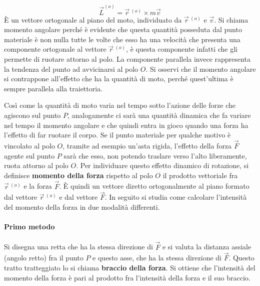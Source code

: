 \[
	\boxed{\vec{L}^{(o)}=\vec{r}\,^{(o)}\times m\vec{v}}
\]
È un vettore ortogonale al piano del moto, individuato da $\vec{r}\,^{(o)}$ e $\vec{v}$. Si chiama momento angolare perché è evidente che questa quantità posseduta dal punto materiale è non nulla tutte le volte che esso ha una velocità che presenta una componente ortogonale al vettore $\vec{r}\,^{(o)}$, è questa componente infatti che gli permette di ruotare attorno al polo. La componente parallela invece rappresenta la tendenza del punto ad avvicinarsi al polo $O$. Si osservi che il momento angolare si contrappone all'effetto che ha la quantità di moto, perché quest'ultima è sempre parallela alla traiettoria.

Così come la quantità di moto varia nel tempo sotto l'azione delle forze che agiscono sul punto $P$, analogamente ci sarà una quantità dinamica che fa variare nel tempo il momento angolare e che quindi entra in gioco quando una forza ha l'effetto di far ruotare il corpo. Se il punto materiale per qualche motivo è vincolato al polo $O$, tramite ad esempio un'asta rigida, l'effetto della forza $\vec{F}$ agente sul punto $P$ sarà che esso, non potendo traslare verso l'alto liberamente, ruota attorno al polo $O$. Per individuare questo effetto dinamico di rotazione, si definisce \textbf{momento della forza} rispetto al polo $O$ il prodotto vettoriale fra $\vec{r}\,^{(o)}$ e la forza $\vec{F}$. È quindi un vettore diretto ortogonalmente al piano formato dal vettore $\vec{r}\,^{(o)}$ e dal vettore $\vec{F}$. In seguito si studia come calcolare l'intensità del momento della forza in due modalità differenti.

\paragraph{Primo metodo} Si disegna una retta che ha la stessa direzione di $\vec{F}$ e si valuta la distanza assiale (angolo retto) fra il punto $P$ e questo asse, che ha la stessa direzione di $\vec{F}$. Questo tratto tratteggiato lo si chiama \textbf{braccio della forza}. Si ottiene che l'intensità del momento della forza è pari al prodotto fra l'intensità della forza e il suo braccio.


